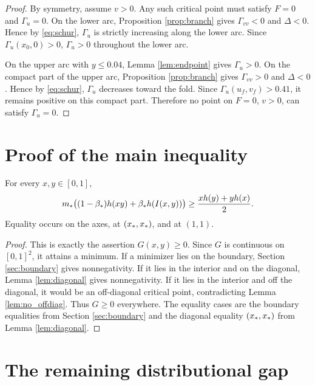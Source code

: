 \begin{proof}
By symmetry, assume \(v>0\).  Any such critical point must satisfy \(F=0\) and \(\Gamma_u=0\).  On the lower arc, Proposition \ref{prop:branch} gives \(\Gamma_{vv}<0\) and \(\Delta<0\).  Hence by \eqref{eq:schur}, \(\Gamma_u\) is strictly increasing along the lower arc.  Since \(\Gamma_u(x_0,0)>0\), \(\Gamma_u>0\) throughout the lower arc.

On the upper arc with \(y\le0.04\), Lemma \ref{lem:endpoint} gives \(\Gamma_u>0\).  On the compact part of the upper arc, Proposition \ref{prop:branch} gives \(\Gamma_{vv}>0\) and \(\Delta<0\).  Hence by \eqref{eq:schur}, \(\Gamma_u\) decreases toward the fold.  Since \(\Gamma_u(u_f,v_f)>0.41\), it remains positive on this compact part.  Therefore no point on \(F=0\), \(v>0\), can satisfy \(\Gamma_u=0\).
\end{proof}

\section{Proof of the main inequality}\label{sec:mainineq}

\begin{theorem}\label{thm:bivariate}
For every \(x,y\in[0,1]\),
\begin{equation}\label{eq:bivar_theorem}
  m_*\bigl((1-\beta_*)h(xy)+\beta_* h(I(x,y))\bigr)\ge \frac{x h(y)+y h(x)}2.
\end{equation}
Equality occurs on the axes, at \((x_*,x_*)\), and at \((1,1)\).
\end{theorem}

\begin{proof}
This is exactly the assertion \(G(x,y)\ge0\).  Since \(G\) is continuous on \([0,1]^2\), it attains a minimum.  If a minimizer lies on the boundary, Section \ref{sec:boundary} gives nonnegativity.  If it lies in the interior and on the diagonal, Lemma \ref{lem:diagonal} gives nonnegativity.  If it lies in the interior and off the diagonal, it would be an off-diagonal critical point, contradicting Lemma \ref{lem:no_offdiag}.  Thus \(G\ge0\) everywhere.  The equality cases are the boundary equalities from Section \ref{sec:boundary} and the diagonal equality \((x_*,x_*)\) from Lemma \ref{lem:diagonal}.
\end{proof}

\section{The remaining distributional gap}\label{sec:gap}

